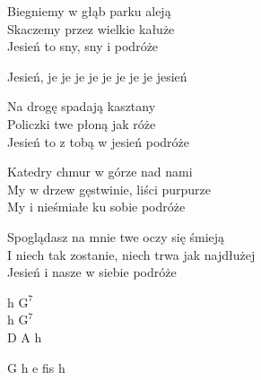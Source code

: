 \begin{text}
    Biegniemy w głąb parku aleją\\
    Skaczemy przez wielkie kałuże\\
    Jesień to sny, sny i podróże

    \vin Jesień, je je je je je je je je jesień

    Na drogę spadają kasztany\\
    Policzki twe płoną jak róże\\
    Jesień to z tobą w jesień podróże

    Katedry chmur w górze nad nami\\
    My w drzew gęstwinie, liści purpurze\\
    My i nieśmiałe ku sobie podróże

    Spoglądasz na mnie twe oczy się śmieją\\
    I niech tak zostanie, niech trwa jak najdłużej\\
    Jesień i nasze w siebie podróże
\end{text}
\begin{chord}
    h $\mathrm{G^{7}}$\\
    h $\mathrm{G^{7}}$\\
    D A h

    G h e fis h
\end{chord}
